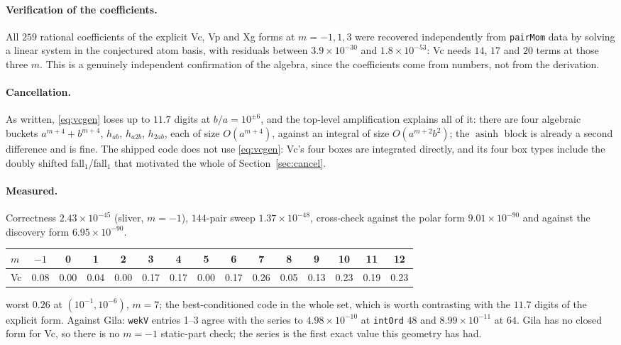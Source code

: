 \documentclass[11pt]{article}
\theoremstyle{remark}
\newcommand{\asinh}{\operatorname{asinh}}
\newcommand{\code}[1]{\texttt{#1}}
\begin{document}
\paragraph{Verification of the coefficients.} All $259$ rational coefficients of the
explicit Vc, Vp and Xg forms at $m = -1, 1, 3$ were recovered independently from
\code{pairMom} data by solving a linear system in the conjectured atom basis, with
residuals between $3.9\times10^{-30}$ and $1.8\times10^{-53}$: Vc needs $14$, $17$ and
$20$ terms at those three $m$. This is a genuinely independent confirmation of the algebra,
since the coefficients come from numbers, not from the derivation.

\paragraph{Cancellation.} As written, \eqref{eq:vcgen} loses up to $11.7$ digits at
$b/a = 10^{\pm 6}$, and the top-level amplification explains all of it: there are four
algebraic buckets $a^{m+4}+b^{m+4}$, $h_{ab}$, $h_{a2b}$, $h_{2ab}$, each of size
$O(a^{m+4})$, against an integral of size $O(a^{m+2}b^2)$; the $\asinh$ block is already a
second difference and is fine. The shipped code does not use \eqref{eq:vcgen}: Vc's four
boxes are integrated directly, and its four box types include the doubly shifted
fall$_1$/fall$_1$ that motivated the whole of Section~\ref{sec:cancel}.

\paragraph{Measured.} Correctness $2.43\times10^{-45}$ (sliver, $m=-1$), $144$-pair sweep
$1.37\times10^{-48}$, cross-check against the polar form $9.01\times10^{-90}$ and against
the discovery form $6.95\times10^{-90}$.

\begin{center}\small
\begin{tabular}{@{}lcccccccccccccc@{}}
\toprule
$m$ & $-1$ & 0 & 1 & 2 & 3 & 4 & 5 & 6 & 7 & 8 & 9 & 10 & 11 & 12\\
\midrule
Vc & 0.08 & 0.00 & 0.04 & 0.00 & 0.17 & 0.17 & 0.00 & 0.17 & 0.26 & 0.05 & 0.13 & 0.23 & 0.19 & 0.23\\
\bottomrule
\end{tabular}
\end{center}
\noindent
worst $0.26$ at $(10^{-1}, 10^{-6})$, $m = 7$; the best-conditioned code in the whole set,
which is worth contrasting with the $11.7$ digits of the explicit form. Against Gila:
\code{wekV} entries 1--3 agree with the series to $4.98\times10^{-10}$ at \code{intOrd}
$48$ and $8.99\times10^{-11}$ at $64$. Gila has no closed form for Vc, so there is no
$m = -1$ static-part check; the series is the first exact value this geometry has had.
\end{document}
